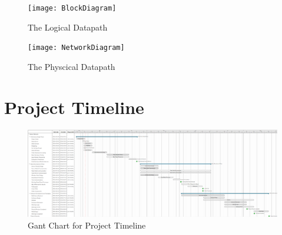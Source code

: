 		\begin{figure}[h!]
			\centering
			\texttt{[image: BlockDiagram]}
			\caption{The Logical Datapath}
			\label{fig:BlockDiagram}
		\end{figure}
		
		\clearpage
		
		\begin{figure}[h!]
			\centering
			\texttt{[image: NetworkDiagram]}
			\caption{The Physcical Datapath}
			\label{fig:NetworkDiagram}
		\end{figure}
		
		\clearpage
		 
	\section{Project Timeline}
	
		\begin{figure}[h!]
			\centering
			\includegraphics[width=0.85\textheight, angle=90]{GantChart}
			\caption{Gant Chart for Project Timeline}
			\label{fig:GantChart}
		\end{figure}
		 
